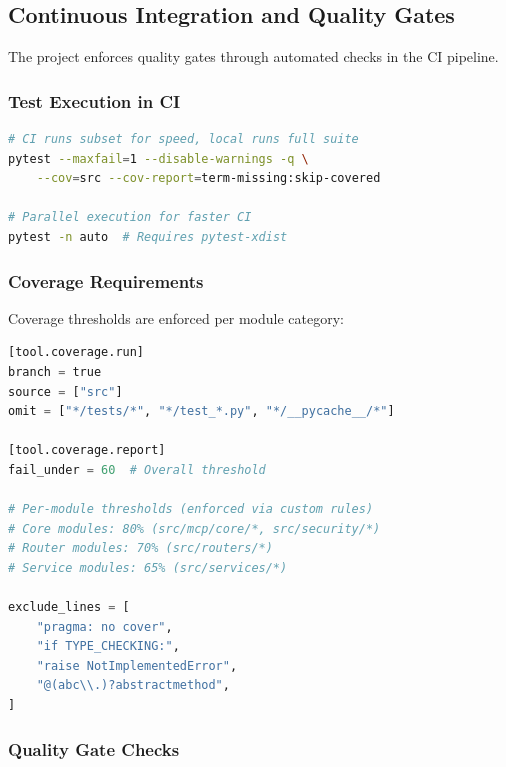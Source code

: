 \subsection{Continuous Integration and Quality Gates}
\label{subsec:ci-quality-gates}

The project enforces quality gates through automated checks in the CI pipeline.

\subsubsection{Test Execution in CI}

\begin{lstlisting}[language=bash, caption={CI test execution configuration.}]
# CI runs subset for speed, local runs full suite
pytest --maxfail=1 --disable-warnings -q \
    --cov=src --cov-report=term-missing:skip-covered

# Parallel execution for faster CI
pytest -n auto  # Requires pytest-xdist
\end{lstlisting}

\subsubsection{Coverage Requirements}

Coverage thresholds are enforced per module category:

\begin{lstlisting}[language=Python, caption={Coverage configuration from \texttt{pyproject.toml}.}]
[tool.coverage.run]
branch = true
source = ["src"]
omit = ["*/tests/*", "*/test_*.py", "*/__pycache__/*"]

[tool.coverage.report]
fail_under = 60  # Overall threshold

# Per-module thresholds (enforced via custom rules)
# Core modules: 80% (src/mcp/core/*, src/security/*)
# Router modules: 70% (src/routers/*)
# Service modules: 65% (src/services/*)

exclude_lines = [
    "pragma: no cover",
    "if TYPE_CHECKING:",
    "raise NotImplementedError",
    "@(abc\\.)?abstractmethod",
]
\end{lstlisting}

\subsubsection{Quality Gate Checks}

